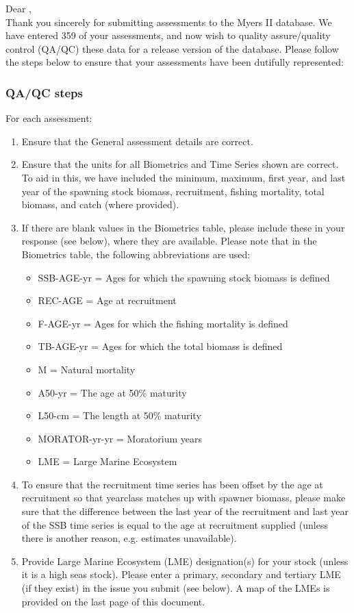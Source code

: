 \documentclass [a4paper, 10pt] {article}
\begin{document}
\noindent Dear ,\\

\noindent Thank you sincerely for submitting assessments to the Myers II database. We have entered 359 of your assessments, and now wish to quality assure/quality control (QA/QC) these data for a release version of the database. Please follow the steps below to ensure that your assessments have been dutifully represented:
\subsubsection{QA/QC steps}
For each assessment:
\begin{enumerate}
\item Ensure that the General assessment details are correct.
\item Ensure that the units for all Biometrics and Time Series shown are correct. To aid in this, we have included the minimum, maximum, first year, and last year of the spawning stock biomass, recruitment, fishing mortality, total biomass, and  catch  (where provided). 
\item If there are blank values in the Biometrics table, please include these in your response (see below), where they are available.
Please note that in the Biometrics table, the following abbreviations are used:
\begin{itemize}
\item SSB-AGE-yr  = Ages for which the spawning stock biomass is defined
\item REC-AGE     = Age at recruitment
\item F-AGE-yr    = Ages for which the fishing mortality is defined 
\item TB-AGE-yr   = Ages for which the total biomass is defined
\item M      = Natural mortality
\item A50-yr      = The age at 50\% maturity
\item L50-cm      = The length at 50\% maturity
\item MORATOR-yr-yr = Moratorium years
\item LME = Large Marine Ecosystem\\
\end{itemize}
\item To ensure that the recruitment time series has been offset by the age at recruitment so that yearclass matches up with spawner biomass, please make sure that the difference between the last year of the recruitment and last year of the SSB time series is equal to the age at recruitment supplied (unless there is another reason, e.g. estimates unavailable). 
\item Provide Large Marine Ecosystem (LME) designation(s) for your stock (unless it is a high seas stock). Please enter a primary, secondary and tertiary LME (if they exist) in the issue you submit (see below). A map of the LMEs is provided on the last page of this document. 
\end{enumerate}
\vspace{-.25in}
\end{document}
